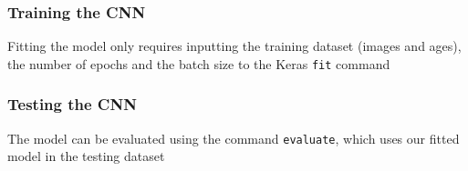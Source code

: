 \documentclass[11pt]{article}
\begin{document}
    \hypertarget{training-the-cnn}{%
\subsubsection*{Training the CNN}\label{training-the-cnn}}

    Fitting the model only requires inputting the training dataset (images
and ages), the number of epochs and the batch size to the Keras
\texttt{fit} command

    \hypertarget{testing-the-cnn}{%
\subsubsection*{Testing the CNN}\label{testing-the-cnn}}

    The model can be evaluated using the command \texttt{evaluate}, which
uses our fitted model in the testing dataset


    
    
    
\end{document}
